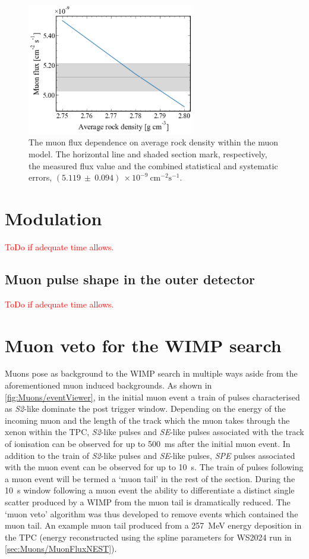\begin{figure}[ht!]
    \centering
    \includegraphics[width=0.65\textwidth]{figures/Muons/Flux_density_ws22_ws24.pdf}
    \caption{The muon flux dependence on average rock density within the muon model. The horizontal line and shaded section mark, respectively, the measured flux value and the combined statistical and systematic errors, $(5.119~\pm~0.094)~\times10^{-9}~\textrm{cm}^{-2}\textrm{s}^{-1}$.}
    \label{fig:Muons/flux_density}
\end{figure}

\section{Modulation}\label{sec:Muons/MuonModulation}
\textcolor{red}{ToDo if adequate time allows.}
\subsection{Muon pulse shape in the outer detector}\label{sec:Muons/MuonModulationODPulseShape}
\textcolor{red}{ToDo if adequate time allows.}

\section{Muon veto for the WIMP search}\label{sec:Muons/MuonVeto}
Muons pose as background to the WIMP search in multiple ways aside from the aforementioned muon induced backgrounds. As shown in \autoref{fig:Muons/eventViewer}, in the initial muon event a train of pulses characterised as \textit{S2}-like dominate the post trigger window. Depending on the energy  of the incoming muon and the length of the track which the muon takes through the xenon within the TPC, \textit{S2}-like pulses and \textit{SE}-like pulses associated with the track of ionisation can be observed for up to 500~ms after the initial muon event. In addition to the train of \textit{S2}-like pulses and \textit{SE}-like pulses, \textit{SPE} pulses associated with the muon event can be observed for up to 10~s. The train of pulses following a muon event will be termed a `muon tail' in the rest of the section. During the 10~s window following a muon event the ability to differentiate a distinct single scatter produced by a WIMP from the muon tail is dramatically reduced. The `muon veto' algorithm was thus developed to remove events which contained the muon tail. An example muon tail produced from a 257~MeV energy deposition in the TPC (energy reconstructed using the spline parameters for WS2024 run in \autoref{sec:Muons/MuonFluxNEST}).

